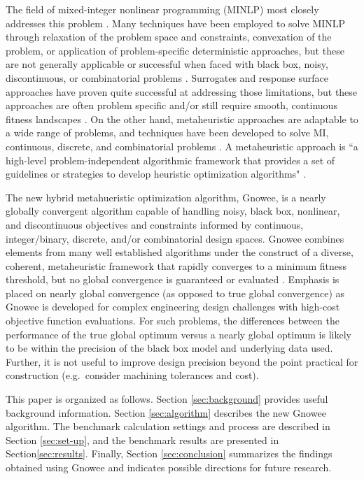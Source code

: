 \documentclass{article}                                                                           %
\begin{document}
The field of mixed-integer nonlinear programming (MINLP) most closely addresses this problem \cite{Burer2012, Floudas2009}.
Many techniques have been employed to solve MINLP through relaxation of the problem space and constraints, convexation of the problem, or application of problem-specific deterministic approaches, but these are not generally applicable or successful when faced with black box, noisy, discontinuous, or combinatorial problems \cite{Floudas2009, Bonami2012, Hemker2008}.
Surrogates and response surface approaches have proven quite successful at addressing those limitations, but these approaches are often problem specific and/or still require smooth, continuous fitness landscapes \cite{Hemker2008, Regis2005}.
On the other hand, metaheuristic approaches are adaptable to a wide range of problems, and techniques have been developed to solve MI, continuous, discrete, and combinatorial problems \cite{Yang2014, Egea2014, Yiqing2007, Tao1998}.
A metaheuristic approach is ``a high-level problem-independent algorithmic framework that provides a set of guidelines or strategies to develop heuristic optimization  algorithms" \cite{Sorensen2016}.

The new hybrid metahueristic optimization algorithm, Gnowee, is a nearly globally convergent algorithm capable of handling noisy, black box, nonlinear, and discontinuous objectives and constraints informed by continuous, integer/binary, discrete, and/or combinatorial design spaces.
Gnowee combines elements from many well established algorithms under the construct of a diverse, coherent, metaheuristic framework that rapidly converges to a minimum fitness threshold, but no global convergence is guaranteed or evaluated \cite{Yang2009,  Sorensen2016, Lones2014}.
Emphasis is placed on nearly global convergence (as opposed to true global convergence) as Gnowee is developed for complex engineering design challenges with high-cost objective function evaluations. 
For such problems, the differences between the performance of the true global optimum versus a nearly global optimum is likely to be within the precision of the black box model and underlying data used. 
Further, it is not useful to improve design precision beyond the point practical for construction (e.g.\ consider machining tolerances and cost).     

This  paper  is  organized  as  follows.  
Section \ref{sec:background} provides useful background information.  
Section \ref{sec:algorithm} describes the new Gnowee algorithm.   
The benchmark calculation settings and process are described in Section \ref{sec:set-up}, and the benchmark results are presented in Section\ref{sec:results}. 
Finally, Section \ref{sec:conclusion} summarizes the findings obtained using Gnowee and indicates possible directions for future research.
\end{document}
